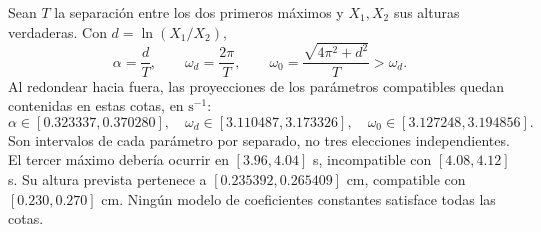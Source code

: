 Sean \(T\) la separación entre los dos primeros máximos y \(X_1,X_2\) sus alturas verdaderas. Con \(d=\ln(X_1/X_2)\),
\[
\alpha=\frac dT,\qquad \omega_d=\frac{2\pi}{T},\qquad
\omega_0=\frac{\sqrt{4\pi^2+d^2}}{T}>\omega_d.
\]
Al redondear hacia fuera, las proyecciones de los parámetros compatibles quedan contenidas en estas cotas, en \(\mathrm s^{-1}\):
\[
\alpha\in[0.323337,0.370280],\quad
\omega_d\in[3.110487,3.173326],\quad
\omega_0\in[3.127248,3.194856].
\]
Son intervalos de cada parámetro por separado, no tres elecciones independientes. El tercer máximo debería ocurrir en \([3.96,4.04]\) s, incompatible con \([4.08,4.12]\) s. Su altura prevista pertenece a \([0.235392,0.265409]\) cm, compatible con \([0.230,0.270]\) cm. Ningún modelo de coeficientes constantes satisface todas las cotas.
